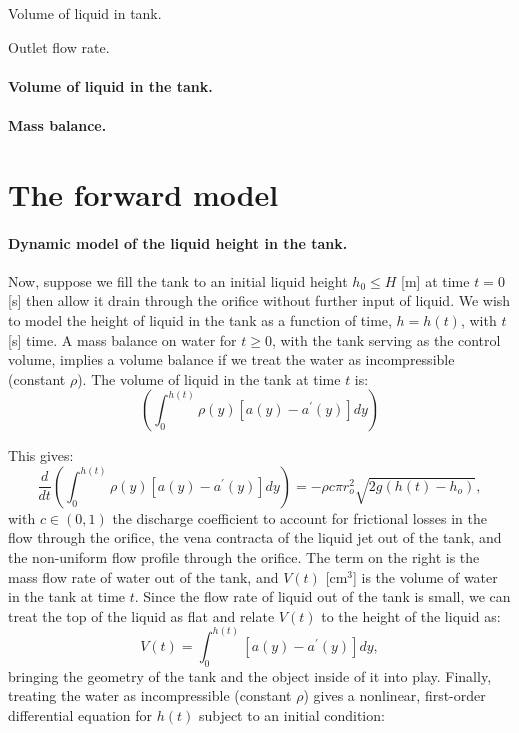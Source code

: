 \documentclass[openacc]{rsproca_new}%
\begin{document}

Volume of liquid in tank. 

Outlet flow rate.


\paragraph{Volume of liquid in the tank.}


\paragraph{Mass balance.}
\section{The forward model}






\paragraph{Dynamic model of the liquid height in the tank.} Now, suppose we fill the tank to an initial liquid height $h_0 \leq H$ [m] at time $t=0$ [s] then allow it drain through the orifice without further input of liquid. We wish to model the height of liquid in the tank as a function of time, $h=h(t)$, with $t$ [s] time. 
A mass balance on water for $t\geq 0$, with the tank serving as the control volume, implies a volume balance if we treat the water as incompressible (constant $\rho$). The volume of liquid in the tank at time $t$ is:
\begin{equation}
	\left ( \int_0^{h(t)} \rho(y) [a(y) - a^\prime(y)]dy \right) 
\end{equation}



This gives:
\begin{equation}
	\frac{d}{dt} \left ( \int_0^{h(t)} \rho(y) [a(y) - a^\prime(y)]dy \right) = - \rho c \pi r_o^2 \sqrt{2 g(h(t)-h_o)},
\end{equation}
with $c\in(0,1)$ the discharge coefficient \cite{lienhard1984velocity,hicks2014determining,wadhwa2021study,teoman2022discharge} to account for frictional losses in the flow through the orifice, the vena contracta of the liquid jet out of the tank, and the non-uniform flow profile through the orifice. The term on the right is the mass flow rate of water out of the tank, and $V(t)$ [cm$^3$] is the volume of water in the tank at time $t$. 
Since the flow rate of liquid out of the tank is small, we can treat the top of the liquid as flat and relate $V(t)$ to the height of the liquid as: 
\begin{equation}
	V(t)=\int_0^{h(t)} [a(y) - a^\prime(y)]dy,
\end{equation}
bringing the geometry of the tank and the object inside of it into play. Finally, treating the water as incompressible (constant $\rho$) gives a nonlinear, first-order differential equation for $h(t)$ subject to an initial condition:
\end{document}
